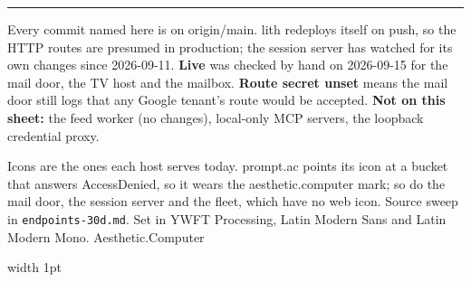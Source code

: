 \documentclass[10pt]{article}
\newcommand{\acdot}{{\color{acpink}.}}
\newcommand{\ac}{Aesthetic{\acdot}Computer}
\begin{document}
\begin{minipage}[t]{0.315\linewidth}
\vspace{0.3em}%
{\color{acdark}\rule{\linewidth}{1.6pt}}\par\vspace{0.18em}%
{\ttfamily\fontsize{7.6pt}{9pt}\selectfont\color{acpink}\par}\vspace{0.3em}
{\fontsize{7.9pt}{9.6pt}\selectfont\color{acgray}\RaggedRight
Every commit named here is on origin/main. lith redeploys itself on push, so the HTTP routes are presumed in production; the session server has watched for its own changes since 2026-09-11. {\color{acdark}\bfseries Live} was checked by hand on 2026-09-15 for the mail door, the TV host and the mailbox. {\color{acdark}\bfseries Route secret unset} means the mail door still logs that any Google tenant's route would be accepted. {\color{acdark}\bfseries Not on this sheet:} the feed worker (no changes), local-only MCP servers, the loopback credential proxy.\par
\vspace{0.3em}
Icons are the ones each host serves today. prompt.ac points its icon at a bucket that answers AccessDenied, so it wears the aesthetic.computer mark; so do the mail door, the session server and the fleet, which have no web icon. Source sweep in \texttt{endpoints-30d.md}. Set in YWFT Processing, Latin Modern Sans and Latin Modern Mono. \ac{}\par}

\end{minipage}%
\hfill{\color{acrule}\vrule width 1pt}\hfill
\end{document}
